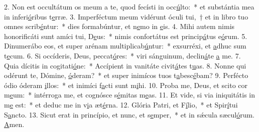 2. Non est occultátum os meum a te, quod fecísti in occ\uline{ú}lto:~* et substántia mea in inferi\uline{ó}ribus t\uline{e}rræ.
3. Imperféctum meum vidérunt óculi tui,~† et in libro tuo omnes scrib\uline{é}ntur:~* dies formabúntur, et n\uline{e}mo in \uline{e}is.
4. Mihi autem nimis honorificáti sunt amíci tui, D\uline{e}us:~* nimis confortátus est princip\uline{á}tus e\uline{ó}rum.
5. Dinumerábo eos, et super arénam multiplicab\uline{ú}ntur:~* exsurréxi, et \uline{a}dhuc sum t\uline{e}cum.
6. Si occíderis, Deus, peccat\uline{ó}res:~* viri sánguinum, declin\uline{á}te \uline{a} me.
7. Quia dícitis in cogitati\uline{ó}ne:~* Accípient in vanitáte civit\uline{á}tes t\uline{u}as.
8. Nonne qui odérunt te, Dómine, \uline{ó}deram?~* et super inimícos tuos t\uline{a}besc\uline{é}bam?
9. Perfécto ódio óderam \uline{i}llos:~* et inimíci f\uline{a}cti sunt m\uline{i}hi.
10. Proba me, Deus, et scito cor m\uline{e}um:~* intérroga me, et cognósce s\uline{é}mitas m\uline{e}as.
11. Et vide, si via iniquitátis in m\uline{e} est:~* et deduc me in v\uline{i}a æt\uline{é}rna.
12. Glória Patri, et F\uline{í}lio,~* et Spir\uline{í}tui S\uline{a}ncto.
13. Sicut erat in princípio, et nunc, et s\uline{e}mper,~* et in sǽcula sæcul\uline{ó}rum. \uline{A}men.
